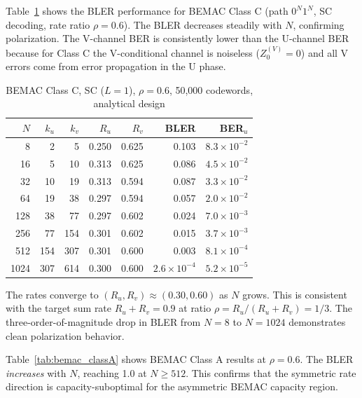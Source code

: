 \documentclass[11pt,a4paper]{article}
\begin{document}
Table~\ref{tab:bemac_classC} shows the BLER performance for BEMAC Class C
(path $0^N 1^N$, SC decoding, rate ratio $\rho = 0.6$). The BLER decreases
steadily with $N$, confirming polarization. The V-channel BER is
consistently lower than the U-channel BER because for Class C the
V-conditional channel is noiseless ($Z_0^{(V)} = 0$) and all V errors come
from error propagation in the U phase.

\begin{table}[h]
\centering
\caption{BEMAC Class C, SC ($L = 1$), $\rho = 0.6$, 50{,}000 codewords, analytical design}
\label{tab:bemac_classC}
\begin{tabular}{rrrrrrr}
\toprule
$N$ & $k_u$ & $k_v$ & $R_u$ & $R_v$ & BLER & BER$_u$ \\
\midrule
   8 &   2 &    5 & 0.250 & 0.625 & 0.103    & $8.3 \times 10^{-2}$ \\
  16 &   5 &   10 & 0.313 & 0.625 & 0.086    & $4.5 \times 10^{-2}$ \\
  32 &  10 &   19 & 0.313 & 0.594 & 0.087    & $3.3 \times 10^{-2}$ \\
  64 &  19 &   38 & 0.297 & 0.594 & 0.057    & $2.0 \times 10^{-2}$ \\
 128 &  38 &   77 & 0.297 & 0.602 & 0.024    & $7.0 \times 10^{-3}$ \\
 256 &  77 &  154 & 0.301 & 0.602 & 0.015    & $3.7 \times 10^{-3}$ \\
 512 & 154 &  307 & 0.301 & 0.600 & 0.003    & $8.1 \times 10^{-4}$ \\
1024 & 307 &  614 & 0.300 & 0.600 & $2.6 \times 10^{-4}$ & $5.2 \times 10^{-5}$ \\
\bottomrule
\end{tabular}
\end{table}

The rates converge to $(R_u, R_v) \approx (0.30, 0.60)$ as $N$ grows.
This is consistent with the target sum rate $R_u + R_v = 0.9$ at ratio
$\rho = R_u / (R_u + R_v) = 1/3$. The three-order-of-magnitude drop in
BLER from $N = 8$ to $N = 1024$ demonstrates clean polarization behavior.

Table~\ref{tab:bemac_classA} shows BEMAC Class A results at $\rho = 0.6$.
The BLER \emph{increases} with $N$, reaching 1.0 at $N \geq 512$. This
confirms that the symmetric rate direction is capacity-suboptimal for the
asymmetric BEMAC capacity region.
\end{document}
